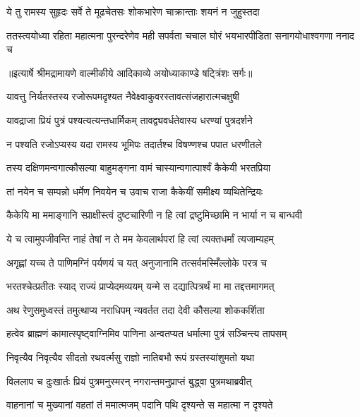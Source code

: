 \twolineshloka
{ये तु रामस्य सुहृदः सर्वे ते मूढचेतसः}
{शोकभारेण चाक्रान्ताः शयनं न जुहुस्तदा} %

\fourlineindentedshloka
{ततस्त्वयोध्या रहिता महात्मना}
{पुरन्दरेणेव मही सपर्वता}
{चचाल घोरं भयभारपीडिता}
{सनागयोधाश्वगणा ननाद च} %


{॥इत्यार्षे श्रीमद्रामायणे वाल्मीकीये आदिकाव्ये अयोध्याकाण्डे षट्त्रिंशः सर्गः॥}


\twolineshloka
{यावत्तु निर्यतस्तस्य रजोरूपमदृश्यत}
{नैवेक्ष्वाकुवरस्तावत्संजहारात्मचक्षुषी} %

\twolineshloka
{यावद्राजा प्रियं पुत्रं पश्यत्यत्यन्तधार्मिकम्}
{तावद्व्यवर्धतेवास्य धरण्यां पुत्रदर्शने} %

\twolineshloka
{न पश्यति रजोऽप्यस्य यदा रामस्य भूमिपः}
{तदार्तश्च विषण्णश्च पपात धरणीतले} %

\twolineshloka
{तस्य दक्षिणमन्वगात्कौसल्या बाहुमङ्गना}
{वामं चास्यान्वगात्पार्श्वं कैकेयी भरतप्रिया} %

\twolineshloka
{तां नयेन च सम्पन्नो धर्मेण निवयेन च}
{उवाच राजा कैकेयीं समीक्ष्य व्यथितेन्द्रियः} %

\twolineshloka
{कैकेयि मा ममाङ्गानि स्प्राक्षीस्त्वं दुष्टचारिणी}
{न हि त्वां द्रष्टुमिच्छामि न भार्या न च बान्धवी} %

\twolineshloka
{ये च त्वामुपजीवन्ति नाहं तेषां न ते मम}
{केवलार्थपरां हि त्वां त्यक्तधर्मां त्यजाम्यहम्} %

\twolineshloka
{अगृह्णां यच्च ते पाणिमग्निं पर्यणयं च यत्}
{अनुजानामि तत्सर्वमस्मिँल्लोके परत्र च} %

\twolineshloka
{भरतश्चेत्प्रतीतः स्याद् राज्यं प्राप्येदमव्ययम्}
{यन्मे स दद्यात्पित्रर्थं मा मा तद्दत्तमागमत्} %

\twolineshloka
{अथ रेणुसमुध्वस्तं तमुत्थाप्य नराधिपम्}
{न्यवर्तत तदा देवी कौसल्या शोककर्शिता} %

\twolineshloka
{हत्वेव ब्राह्मणं कामात्स्पृष्ट्वाग्निमिव पाणिना}
{अन्वतप्यत धर्मात्मा पुत्रं सञ्चिन्त्य तापसम्} %

\twolineshloka
{निवृत्यैव निवृत्यैव सीदतो रथवर्त्मसु}
{राज्ञो नातिबभौ रूपं ग्रस्तस्यांशुमतो यथा} %

\twolineshloka
{विललाप च दुःखार्तः प्रियं पुत्रमनुस्मरन्}
{नगरान्तमनुप्राप्तं बुद्ध्वा पुत्रमथाब्रवीत्} %

\twolineshloka
{वाहनानां च मुख्यानां वहतां तं ममात्मजम्}
{पदानि पथि दृश्यन्ते स महात्मा न दृश्यते} %

